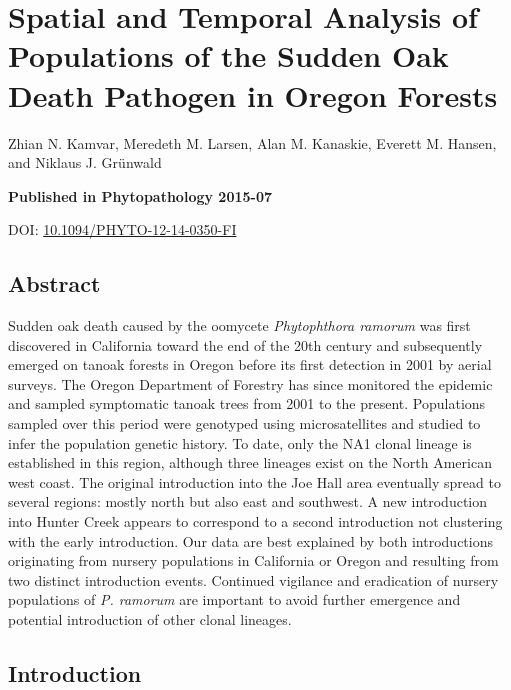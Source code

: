 \documentclass[double,12pt]{beavtex}
\begin{document}
  \chapter{Spatial and Temporal Analysis of Populations of the Sudden Oak
  Death Pathogen in Oregon
  Forests}\label{spatial-and-temporal-analysis-of-populations-of-the-sudden-oak-death-pathogen-in-oregon-forests}
  
  Zhian N. Kamvar, Meredeth M. Larsen, Alan M. Kanaskie, Everett M.
  Hansen, and Niklaus J. Grünwald
  
  \vspace*{\fill}
  
  \textbf{Published in Phytopathology 2015-07}
  
  DOI:
  \href{http://dx.doi.org/10.1094/PHYTO-12-14-0350-FI}{10.1094/PHYTO-12-14-0350-FI}
  
  \newpage
  
  \section{Abstract}\label{abstract-2}
  
  Sudden oak death caused by the oomycete \emph{Phytophthora ramorum} was
  first discovered in California toward the end of the 20th century and
  subsequently emerged on tanoak forests in Oregon before its first
  detection in 2001 by aerial surveys. The Oregon Department of Forestry
  has since monitored the epidemic and sampled symptomatic tanoak trees
  from 2001 to the present. Populations sampled over this period were
  genotyped using microsatellites and studied to infer the population
  genetic history. To date, only the NA1 clonal lineage is established in
  this region, although three lineages exist on the North American west
  coast. The original introduction into the Joe Hall area eventually
  spread to several regions: mostly north but also east and southwest. A
  new introduction into Hunter Creek appears to correspond to a second
  introduction not clustering with the early introduction. Our data are
  best explained by both introductions originating from nursery
  populations in California or Oregon and resulting from two distinct
  introduction events. Continued vigilance and eradication of nursery
  populations of \emph{P. ramorum} are important to avoid further
  emergence and potential introduction of other clonal lineages.
  
  \section{Introduction}\label{introduction-2}
  
\end{document}
